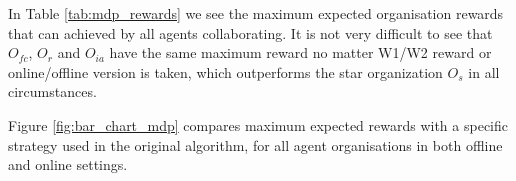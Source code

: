 \documentclass{llncs}
\begin{document}
\begin{table}
\centering
{}
\caption{Maximal rewards that can be achieved by agent organisations from figure \ref{fig:network_configurations} using algorithm \ref{alg:join_team_nondet}'s offline and online versions defined in algorithm \ref{alg:main_process}.}
\label{tab:mdp_rewards}
\end{table}

In Table \ref{tab:mdp_rewards} we see the maximum expected organisation rewards that can achieved by all agents collaborating. It is not very difficult to see that $O_{fc}$, $O_r$ and $O_{ia}$ have the same maximum reward no matter W1/W2 reward or online/offline version is taken, which outperforms the star organization $O_s$ in all circumstances.

Figure \ref{fig:bar_chart_mdp} compares maximum expected rewards with a specific strategy used in the original algorithm, for all agent organisations in both offline and online settings.
%
%
\end{document}
